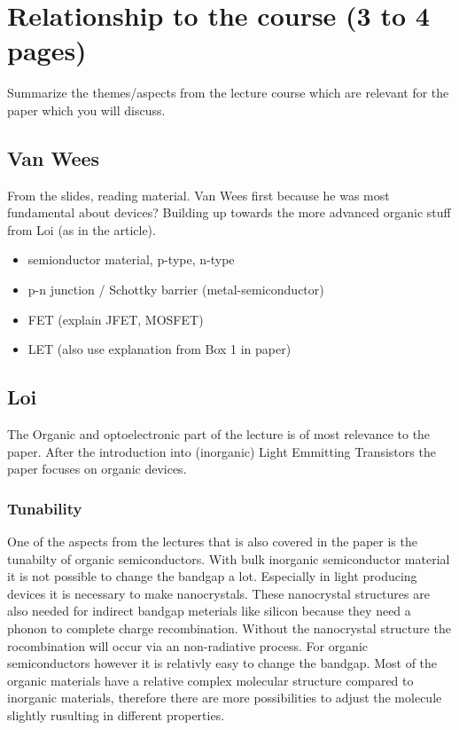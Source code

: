 \section{Relationship to the course (3 to 4 pages)}
Summarize the themes/aspects from the lecture course which are relevant for the paper which you will discuss. 



\subsection{Van Wees}
From the slides, reading material. Van Wees first because he was most fundamental about devices? Building up towards the more advanced organic stuff from Loi (as in the article).

\begin{itemize}
\item semionductor material, p-type, n-type
\item p-n junction / Schottky barrier (metal-semiconductor)
\item FET (explain JFET, MOSFET)
\item LET (also use explanation from Box 1 in paper)
\end{itemize}


\subsection{Loi}
The Organic and optoelectronic part of the lecture is of most relevance to the paper. After the introduction into (inorganic) Light Emmitting Transistors the paper focuses on organic devices. 

\subsubsection{Tunability}
One of the aspects from the lectures that is also covered in the paper is the tunabilty of organic semiconductors. With bulk inorganic semiconductor material it is not possible to change the bandgap a lot. Especially in light producing devices it is necessary to make nanocrystals. These nanocrystal structures are also needed for indirect bandgap meterials like silicon because they need a phonon to complete charge recombination. Without the nanocrystal structure the rocombination will occur via an non-radiative process. For organic semiconductors however it is relativly easy to change the bandgap. Most of the organic materials have a relative complex molecular structure compared to inorganic materials, therefore there are more possibilities to adjust the molecule slightly rusulting in different properties. 
